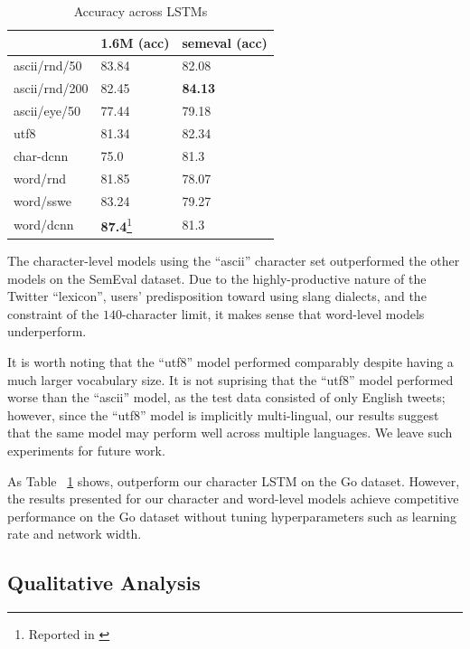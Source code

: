 \documentclass{article} %
\begin{document}
\begin{table}[h!]
\centering
\caption{Accuracy across LSTMs}
\begin{tabular}{|l|ll|}
\hline
              & 1.6M (acc)          & semeval (acc) \\
\hline
ascii/rnd/50  & 83.84          & 82.08            \\
ascii/rnd/200 & 82.45          & \textbf{84.13}   \\
ascii/eye/50  & 77.44          & 79.18   \\
utf8          & 81.34          & 82.34   \\
char-dcnn     & 75.0           & 81.3    \\
word/rnd      & 81.85          & 78.07   \\
word/sswe     & 83.24          & 79.27   \\
word/dcnn     & \textbf{87.4}\footnote{Reported in \cite{kalchbrenner2014convolutional}}           & 81.3    \\
\hline
\end{tabular}
\label{table:results}
\end{table}

The character-level models using the ``ascii'' character set outperformed the other models on the SemEval dataset. Due to the highly-productive nature of the Twitter ``lexicon'', users' predisposition toward using slang dialects, and the constraint of the $140$-character limit, it makes sense that word-level models underperform.

It is worth noting that the ``utf8'' model performed comparably despite having a much larger vocabulary size. It is not suprising that the ``utf8'' model performed worse than the ``ascii'' model, as the test data consisted of only English tweets; however, since the ``utf8'' model is implicitly multi-lingual, our results suggest that the same model may perform well across multiple languages. We leave such experiments for future work.

As Table ~\ref{table:results} shows, \cite{kalchbrenner2014convolutional} outperform our character LSTM on the Go dataset. However, the results presented for our character and word-level models achieve competitive performance on the Go dataset without tuning hyperparameters such as learning rate and network width. 

\subsection{Qualitative Analysis}
\end{document}
